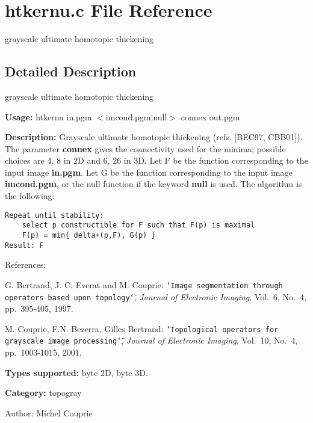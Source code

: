 \section{htkernu.c File Reference}
\label{htkernu_8c}
grayscale ultimate homotopic thickening 



\subsection{Detailed Description}
grayscale ultimate homotopic thickening 

{\bf Usage:} htkernu in.pgm $<$imcond.pgm$|$null$>$ connex out.pgm

{\bf Description:} Grayscale ultimate homotopic thickening (refs. [BEC97, CBB01]). The parameter {\bf connex} gives the connectivity used for the minima; possible choices are 4, 8 in 2D and 6, 26 in 3D. Let F be the function corresponding to the input image {\bf in.pgm}. Let G be the function corresponding to the input image {\bf imcond.pgm}, or the null function if the keyword {\bf null} is used. The algorithm is the following:



\footnotesize\begin{verbatim}Repeat until stability:
    select p constructible for F such that F(p) is maximal
    F(p) = min{ delta+(p,F), G(p) }    
Result: F
\end{verbatim}
\normalsize


References:\par
 [BEC97] G. Bertrand, J. C. Everat and M. Couprie: {\tt \char`\"{}Image segmentation through operators based upon topology\char`\"{}}, {\em  Journal of Electronic Imaging\/}, Vol.~6, No.~4, pp.~395-405, 1997.\par
 [CBB01] M. Couprie, F.N. Bezerra, Gilles Bertrand: {\tt \char`\"{}Topological operators for grayscale image processing\char`\"{}}, {\em  Journal of Electronic Imaging\/}, Vol.~10, No.~4, pp.~1003-1015, 2001.

{\bf Types supported:} byte 2D, byte 3D.

{\bf Category:} topogray

\begin{Desc}
\item[Author:]Michel Couprie \end{Desc}
